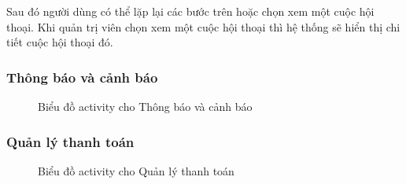 Sau đó người dùng có thể lặp lại các bước trên hoặc chọn xem một cuộc hội thoại. Khi quản trị viên chọn xem một cuộc hội thoại thì hệ thống sẽ hiển thị chi tiết cuộc hội thoại đó.
\subsubsection{Thông báo và cảnh báo}
\begin{figure}[H]
    \centering
     
    \vspace{0.5cm}
    \caption{Biểu đồ activity cho Thông báo và cảnh báo}
    \label{fig:enter-label}
\end{figure}
\subsubsection{Quản lý thanh toán}
\begin{figure}[H]
    \centering
     
    \vspace{0.5cm}
    \caption{Biểu đồ activity cho Quản lý thanh toán}
    \label{fig:enter-label}
\end{figure}
